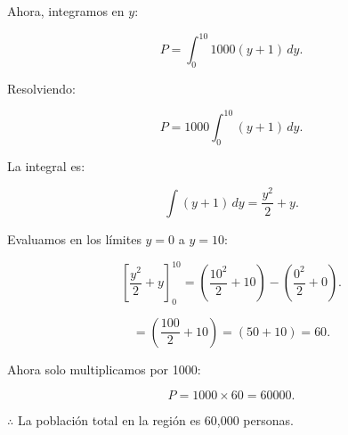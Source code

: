 \documentclass{article}
\begin{document}
Ahora, integramos en \( y \):

   \[
   P = \int_0^{10} 1000(y+1) \, dy.
   \]

   Resolviendo:

   \[
   P = 1000 \int_0^{10} (y+1) \, dy.
   \]

   La integral es:

   \[
   \int (y+1) \, dy = \frac{y^2}{2} + y.
   \]

   Evaluamos en los límites \( y=0 \) a \( y=10 \):

   \[
   \left[ \frac{y^2}{2} + y \right]_0^{10} = \left( \frac{10^2}{2} + 10 \right) - \left( \frac{0^2}{2} + 0 \right).
   \]

   \[
   = \left( \frac{100}{2} + 10 \right) = (50+10) = 60.
   \]

Ahora solo multiplicamos por 1000:

   \[
   P = 1000 \times 60 = 60000.
   \]

$\therefore$ La población total en la región es 60,000 personas.
\end{document}

